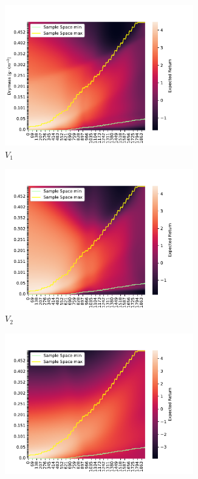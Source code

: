 \begin{figure}[H]
	\centering
	\begin{subfigure}[b]{0.49\textwidth}
		\centering
		\includegraphics[width=0.9\textwidth]{figures/deep_full_heatmap-eps-converted-to.pdf}
		\caption{$V_1$}
		\label{fig:v1_heatmap}
	\end{subfigure}
	\hfill
	\begin{subfigure}[b]{0.49\textwidth}
		\centering
		\includegraphics[width=0.9\textwidth]{figures/deep_less_heatmap-eps-converted-to.pdf}
		\caption{$V_2$}
		\label{fig:v2_heatmap}
	\end{subfigure}
	\vfill
	\begin{subfigure}[b]{0.49\textwidth}
		\centering
		\includegraphics[width=0.9\textwidth]{figures/shallow_full_heatmap-eps-converted-to.pdf}

\end{subfigure}
\end{figure}

